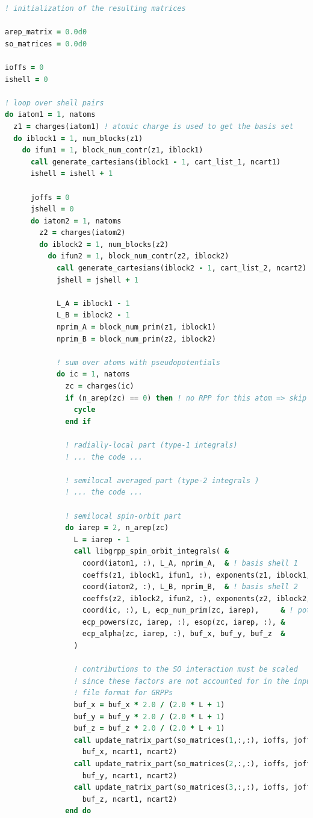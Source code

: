 \documentclass[12pt]{article}
\begin{document}
\begin{lstlisting}[language=Fortran]
! initialization of the resulting matrices

arep_matrix = 0.0d0
so_matrices = 0.0d0

ioffs = 0
ishell = 0

! loop over shell pairs
do iatom1 = 1, natoms
  z1 = charges(iatom1) ! atomic charge is used to get the basis set
  do iblock1 = 1, num_blocks(z1)
    do ifun1 = 1, block_num_contr(z1, iblock1)
      call generate_cartesians(iblock1 - 1, cart_list_1, ncart1)
      ishell = ishell + 1
      
      joffs = 0
      jshell = 0
      do iatom2 = 1, natoms
        z2 = charges(iatom2)
        do iblock2 = 1, num_blocks(z2)
          do ifun2 = 1, block_num_contr(z2, iblock2)
            call generate_cartesians(iblock2 - 1, cart_list_2, ncart2)
            jshell = jshell + 1

            L_A = iblock1 - 1
            L_B = iblock2 - 1
            nprim_A = block_num_prim(z1, iblock1)
            nprim_B = block_num_prim(z2, iblock2)

            ! sum over atoms with pseudopotentials
            do ic = 1, natoms
              zc = charges(ic)
              if (n_arep(zc) == 0) then ! no RPP for this atom => skip it
                cycle
              end if

              ! radially-local part (type-1 integrals)
              ! ... the code ...

              ! semilocal averaged part (type-2 integrals )
              ! ... the code ...

              ! semilocal spin-orbit part
              do iarep = 2, n_arep(zc)
                L = iarep - 1
                call libgrpp_spin_orbit_integrals( &
                  coord(iatom1, :), L_A, nprim_A,  & ! basis shell 1
                  coeffs(z1, iblock1, ifun1, :), exponents(z1, iblock1, :), &
                  coord(iatom2, :), L_B, nprim_B,  & ! basis shell 2
                  coeffs(z2, iblock2, ifun2, :), exponents(z2, iblock2, :), &
                  coord(ic, :), L, ecp_num_prim(zc, iarep),     & ! potential
                  ecp_powers(zc, iarep, :), esop(zc, iarep, :), &
                  ecp_alpha(zc, iarep, :), buf_x, buf_y, buf_z  &
                )
                
                ! contributions to the SO interaction must be scaled
                ! since these factors are not accounted for in the input
                ! file format for GRPPs
                buf_x = buf_x * 2.0 / (2.0 * L + 1)
                buf_y = buf_y * 2.0 / (2.0 * L + 1)
                buf_z = buf_z * 2.0 / (2.0 * L + 1)
                call update_matrix_part(so_matrices(1,:,:), ioffs, joffs, &
                  buf_x, ncart1, ncart2)
                call update_matrix_part(so_matrices(2,:,:), ioffs, joffs, &
                  buf_y, ncart1, ncart2)
                call update_matrix_part(so_matrices(3,:,:), ioffs, joffs, &
                  buf_z, ncart1, ncart2)
              end do


\end{lstlisting}
\end{document}
